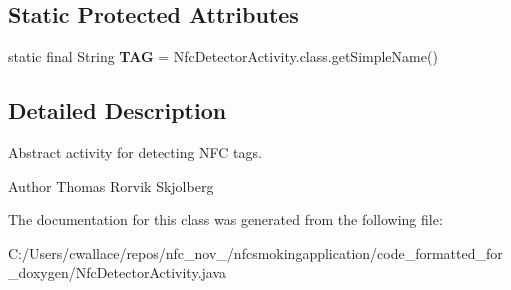 \subsection*{Static Protected Attributes}
\begin{DoxyCompactItemize}
\item 
\hypertarget{classcom_1_1antares_1_1nfc_1_1client_1_1_nfc_detector_activity_a5860272da6c6369b91b461cedb0111a9}{static final String {\bfseries T\-A\-G} = Nfc\-Detector\-Activity.\-class.\-get\-Simple\-Name()}\label{classcom_1_1antares_1_1nfc_1_1client_1_1_nfc_detector_activity_a5860272da6c6369b91b461cedb0111a9}

\end{DoxyCompactItemize}


\subsection{Detailed Description}
Abstract activity for detecting N\-F\-C tags.

\begin{DoxyAuthor}{Author}
Thomas Rorvik Skjolberg 
\end{DoxyAuthor}


The documentation for this class was generated from the following file\-:\begin{DoxyCompactItemize}
\item 
C\-:/\-Users/cwallace/repos/nfc\-\_\-nov\-\_/nfcsmokingapplication/code\-\_\-formatted\-\_\-for\-\_\-doxygen/Nfc\-Detector\-Activity.\-java\end{DoxyCompactItemize}
